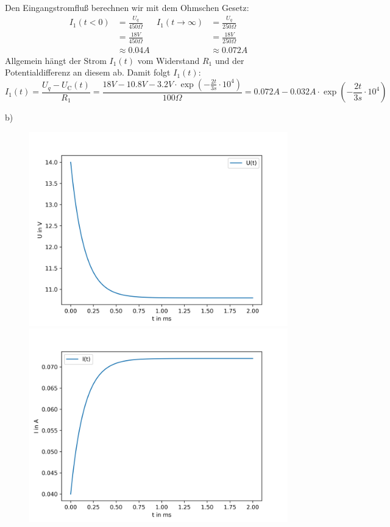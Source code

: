 \documentclass[11pt a4paper]{article}
\begin{document}
Den Eingangstromfluß berechnen wir mit dem Ohmschen Gesetz:
\begin{align*}
	I_1(t < 0) &= \frac{U_q}{450\Omega} &
	I_1(t \rightarrow \infty) &= \frac{U_q}{250\Omega}
	\\
	&= \frac{18V}{450\Omega} & &= \frac{18V}{250\Omega} \\
	&\approx 0.04 A & &\approx 0.072A
\end{align*}
Allgemein hängt der Strom $I_1(t)$ vom Widerstand $R_1$ und der 
Potentialdifferenz an diesem ab. Damit folgt $I_1(t)$:
\[
	I_1(t) = \frac{U_q - U_\text{C}(t)}{R_1}
	= \frac{18V - 10.8V -  3.2V \cdot 
	\exp\left(-\frac{2t}{3s} \cdot 10^4\right)}{100\Omega}
	= 0.072 A  - 0.032A \cdot \exp\left(-\frac{2t}{3s} \cdot 10^4\right)
\]

\newpage
b)

\begin{figure}[H]
	\centering
	\includegraphics[width=12cm]{aufgabe5b_U.png}
	\includegraphics[width=12cm]{aufgabe5b_I.png}
\end{figure}
\end{document}
